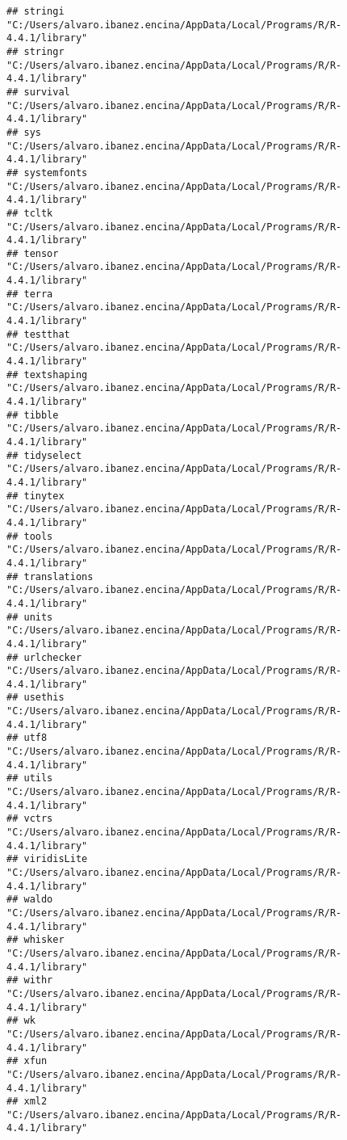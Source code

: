 \documentclass[
]{article}
\begin{document}
\begin{verbatim}
## stringi            "C:/Users/alvaro.ibanez.encina/AppData/Local/Programs/R/R-4.4.1/library"
## stringr            "C:/Users/alvaro.ibanez.encina/AppData/Local/Programs/R/R-4.4.1/library"
## survival           "C:/Users/alvaro.ibanez.encina/AppData/Local/Programs/R/R-4.4.1/library"
## sys                "C:/Users/alvaro.ibanez.encina/AppData/Local/Programs/R/R-4.4.1/library"
## systemfonts        "C:/Users/alvaro.ibanez.encina/AppData/Local/Programs/R/R-4.4.1/library"
## tcltk              "C:/Users/alvaro.ibanez.encina/AppData/Local/Programs/R/R-4.4.1/library"
## tensor             "C:/Users/alvaro.ibanez.encina/AppData/Local/Programs/R/R-4.4.1/library"
## terra              "C:/Users/alvaro.ibanez.encina/AppData/Local/Programs/R/R-4.4.1/library"
## testthat           "C:/Users/alvaro.ibanez.encina/AppData/Local/Programs/R/R-4.4.1/library"
## textshaping        "C:/Users/alvaro.ibanez.encina/AppData/Local/Programs/R/R-4.4.1/library"
## tibble             "C:/Users/alvaro.ibanez.encina/AppData/Local/Programs/R/R-4.4.1/library"
## tidyselect         "C:/Users/alvaro.ibanez.encina/AppData/Local/Programs/R/R-4.4.1/library"
## tinytex            "C:/Users/alvaro.ibanez.encina/AppData/Local/Programs/R/R-4.4.1/library"
## tools              "C:/Users/alvaro.ibanez.encina/AppData/Local/Programs/R/R-4.4.1/library"
## translations       "C:/Users/alvaro.ibanez.encina/AppData/Local/Programs/R/R-4.4.1/library"
## units              "C:/Users/alvaro.ibanez.encina/AppData/Local/Programs/R/R-4.4.1/library"
## urlchecker         "C:/Users/alvaro.ibanez.encina/AppData/Local/Programs/R/R-4.4.1/library"
## usethis            "C:/Users/alvaro.ibanez.encina/AppData/Local/Programs/R/R-4.4.1/library"
## utf8               "C:/Users/alvaro.ibanez.encina/AppData/Local/Programs/R/R-4.4.1/library"
## utils              "C:/Users/alvaro.ibanez.encina/AppData/Local/Programs/R/R-4.4.1/library"
## vctrs              "C:/Users/alvaro.ibanez.encina/AppData/Local/Programs/R/R-4.4.1/library"
## viridisLite        "C:/Users/alvaro.ibanez.encina/AppData/Local/Programs/R/R-4.4.1/library"
## waldo              "C:/Users/alvaro.ibanez.encina/AppData/Local/Programs/R/R-4.4.1/library"
## whisker            "C:/Users/alvaro.ibanez.encina/AppData/Local/Programs/R/R-4.4.1/library"
## withr              "C:/Users/alvaro.ibanez.encina/AppData/Local/Programs/R/R-4.4.1/library"
## wk                 "C:/Users/alvaro.ibanez.encina/AppData/Local/Programs/R/R-4.4.1/library"
## xfun               "C:/Users/alvaro.ibanez.encina/AppData/Local/Programs/R/R-4.4.1/library"
## xml2               "C:/Users/alvaro.ibanez.encina/AppData/Local/Programs/R/R-4.4.1/library"

\end{verbatim}
\end{document}
